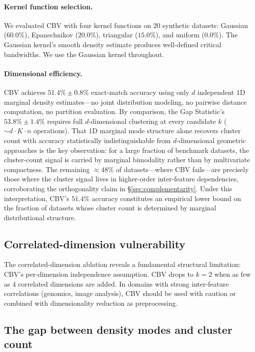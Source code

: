 \documentclass[journal]{IEEEtran}
\begin{document}
\paragraph{Kernel function selection.}
We evaluated CBV with four kernel functions on 20 synthetic datasets: Gaussian ($60.0\%$), Epanechnikov ($20.0\%$), triangular ($15.0\%$), and uniform ($0.0\%$). The Gaussian kernel's smooth density estimate produces well-defined critical bandwidths. We use the Gaussian kernel throughout.

\paragraph{Dimensional efficiency.}
CBV achieves $51.4\% \pm 0.8\%$ exact-match accuracy using only $d$ independent 1D marginal density estimates---no joint distribution modeling, no pairwise distance computation, no partition evaluation. By comparison, the Gap Statistic's $53.8\% \pm 1.4\%$ requires full $d$-dimensional clustering at every candidate $k$ ($\sim d \cdot K \cdot n$ operations). That 1D marginal mode structure alone recovers cluster count with accuracy statistically indistinguishable from $d$-dimensional geometric approaches is the key observation: for a large fraction of benchmark datasets, the cluster-count signal is carried by marginal bimodality rather than by multivariate compactness. The remaining $\approx 48\%$ of datasets---where CBV fails---are precisely those where the cluster signal lives in higher-order inter-feature dependencies, corroborating the orthogonality claim in §\ref{sec:complementarity}. Under this interpretation, CBV's $51.4\%$ accuracy constitutes an empirical lower bound on the fraction of datasets whose cluster count is determined by marginal distributional structure.

\subsection{Correlated-dimension vulnerability}
\label{sec:correlated-vulnerability}

The correlated-dimension ablation reveals a fundamental structural limitation: CBV's per-dimension independence assumption. CBV drops to $k = 2$ when as few as 4 correlated dimensions are added. In domains with strong inter-feature correlations (genomics, image analysis), CBV should be used with caution or combined with dimensionality reduction as preprocessing.

\subsection{The gap between density modes and cluster count}
\label{sec:gap-modes-clusters}
\end{document}
